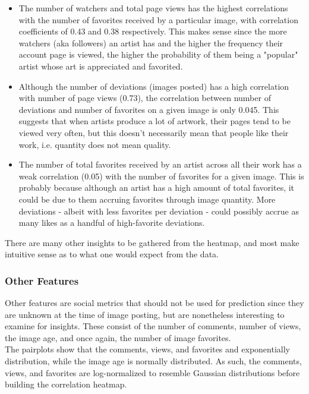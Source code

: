 \documentclass[11pt]{article}
\begin{document}
\begin{itemize}
\item
  The number of watchers and total page views has the highest
  correlations with the number of favorites received by a particular
  image, with correlation coefficients of 0.43 and 0.38 respectively.
  This makes sense since the more watchers (aka followers) an artist has
  and the higher the frequency their account page is viewed, the higher
  the probability of them being a "popular" artist whose art is
  appreciated and favorited.
\item
  Although the number of deviations (images posted) has a high
  correlation with number of page views (0.73), the correlation between
  number of deviations and number of favorites on a given image is only
  0.045. This suggests that when artists produce a lot of artwork, their
  pages tend to be viewed very often, but this doesn't necessarily mean
  that people like their work, i.e. quantity does not mean quality.
\item
  The number of total favorites received by an artist across all their
  work has a weak correlation (0.05) with the number of favorites for a
  given image. This is probably because although an artist has a high
  amount of total favorites, it could be due to them accruing favorites
  through image quantity. More deviations - albeit with less favorites
  per deviation - could possibly accrue as many likes as a handful of
  high-favorite deviations.
\end{itemize}

There are many other insights to be gathered from the heatmap, and most
make intuitive sense as to what one would expect from the data.
    \newpage
    \subsubsection{Other Features}

Other features are social metrics that should not be used for prediction
since they are unknown at the time of image posting, but are nonetheless
interesting to examine for insights. These consist of the number of
comments, number of views, the image age, and once again, the number of
image favorites.\\

The pairplots show that the comments, views, and favorites and
exponentially distribution, while the image age is normally distributed.
As such, the comments, views, and favorites are log-normalized to
resemble Gaussian distributions before building the correlation heatmap.
\end{document}
